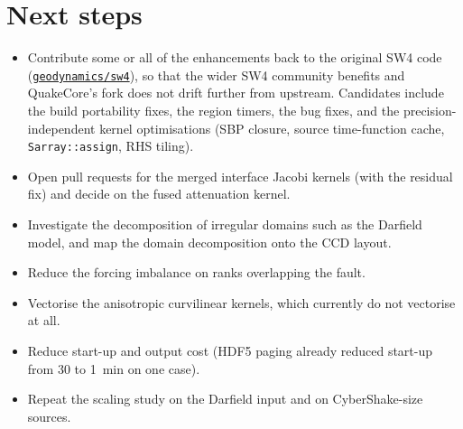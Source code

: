 \documentclass[11pt,a4paper]{article}
\newcommand{\code}[1]{\texttt{#1}}
\begin{document}
\section{Next steps}
\begin{itemize}[itemsep=2pt]
  \item Contribute some or all of the enhancements back to the original SW4
        code (\href{https://github.com/geodynamics/sw4}{\code{geodynamics/sw4}}),
        so that the wider SW4 community benefits and QuakeCore's fork does not
        drift further from upstream. Candidates include the build portability
        fixes, the region timers, the bug fixes, and the precision-independent
        kernel optimisations (SBP closure, source time-function cache,
        \code{Sarray::assign}, RHS tiling).
  \item Open pull requests for the merged interface Jacobi kernels (with the
        residual fix) and decide on the fused attenuation kernel.
  \item Investigate the decomposition of irregular domains such as the
        Darfield model, and map the domain decomposition onto the CCD layout.
  \item Reduce the forcing imbalance on ranks overlapping the fault.
  \item Vectorise the anisotropic curvilinear kernels, which currently do not
        vectorise at all.
  \item Reduce start-up and output cost (HDF5 paging already reduced start-up
        from 30 to 1~min on one case).
  \item Repeat the scaling study on the Darfield input and on CyberShake-size
        sources.
\end{itemize}
\end{document}
